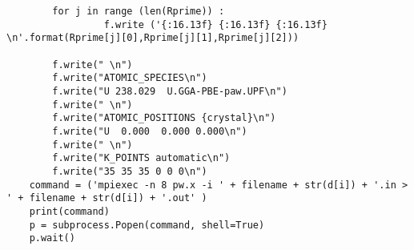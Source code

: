 \begin{lstlisting}
        for j in range (len(Rprime)) :
                 f.write ('{:16.13f} {:16.13f} {:16.13f} \n'.format(Rprime[j][0],Rprime[j][1],Rprime[j][2]))
    
        f.write(" \n")
        f.write("ATOMIC_SPECIES\n")
        f.write("U 238.029  U.GGA-PBE-paw.UPF\n")
        f.write(" \n")
        f.write("ATOMIC_POSITIONS {crystal}\n")
        f.write("U  0.000  0.000 0.000\n")
        f.write(" \n")
        f.write("K_POINTS automatic\n")
        f.write("35 35 35 0 0 0\n")
    command = ('mpiexec -n 8 pw.x -i ' + filename + str(d[i]) + '.in > ' + filename + str(d[i]) + '.out' )
    print(command)
    p = subprocess.Popen(command, shell=True)
    p.wait()

\end{lstlisting}


